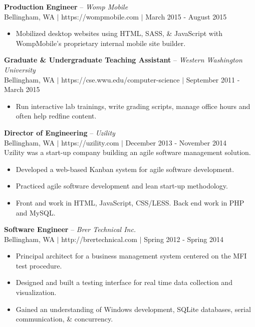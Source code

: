 \documentclass[line,margin]{res}
\begin{document}
\begin{resume}
    {\bf Production Engineer} -- {\sl Womp Mobile} \\
    {\footnotesize Bellingham, WA $|$ https://wompmobile.com $|$ March 2015 - August 2015}
    \begin{itemize} \itemsep -2pt
        \item Mobilized desktop websites using HTML, SASS, \& JavaScript with WompMobile's proprietary internal mobile site builder.
    \end{itemize}

    {\bf Graduate \& Undergraduate Teaching Assistant} -- {\sl Western Washington University} \\
    {\footnotesize Bellingham, WA $|$ https://cse.wwu.edu/computer-science $|$ September 2011 - March 2015}
    \begin{itemize} \itemsep -2pt
        \item Run interactive lab trainings, write grading scripts, manage office hours and often help redfine content.
    \end{itemize}

    {\bf Director of Engineering} -- {\sl Uzility} \\
    {\footnotesize Bellingham, WA $|$ https://uzility.com $|$ December 2013 - November 2014} \\
    Uzility was a start-up company building an agile software management solution.
    \begin{itemize}  \itemsep -2pt
        \item Developed a web-based Kanban system for agile software development.
        \item Practiced agile software development and lean start-up methodology.
        \item Front and work in HTML, JavaScript, CSS/LESS. Back end work in PHP and MySQL.
    \end{itemize}
    
    {\bf Software Engineer} -- {\sl Brer Technical Inc.} \\
    {\footnotesize Bellingham, WA $|$ http://brertechnical.com $|$ Spring 2012 - Spring 2014}
    \begin{itemize} \itemsep -2pt
        \item Principal architect for a business management system centered on the MFI test procedure.
        \item Designed and built a testing interface for real time data collection and visualization.
        \item Gained an understanding of Windows development, SQLite databases, serial communication, \& concurrency.
    \end{itemize}
 

\end{resume}
\end{document}
